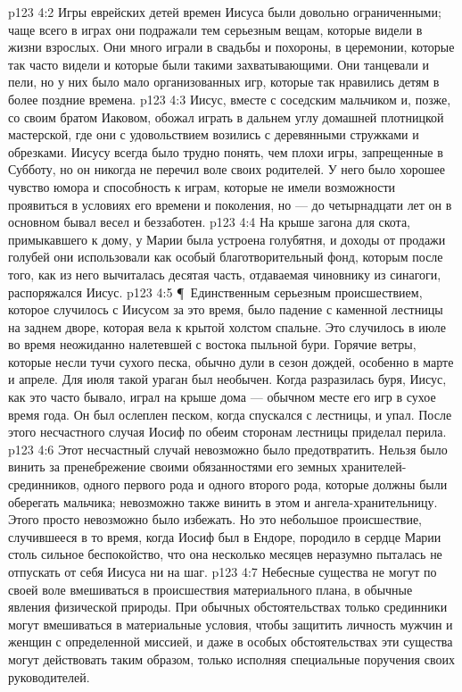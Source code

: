 \vs p123 4:2 Игры еврейских детей времен Иисуса были довольно ограниченными; чаще всего в играх они подражали тем серьезным вещам, которые видели в жизни взрослых. Они много играли в свадьбы и похороны, в церемонии, которые так часто видели и которые были такими захватывающими. Они танцевали и пели, но у них было мало организованных игр, которые так нравились детям в более поздние времена.
\vs p123 4:3 Иисус, вместе с соседским мальчиком и, позже, со своим братом Иаковом, обожал играть в дальнем углу домашней плотницкой мастерской, где они с удовольствием возились с деревянными стружками и обрезками. Иисусу всегда было трудно понять, чем плохи игры, запрещенные в Субботу, но он никогда не перечил воле своих родителей. У него было хорошее чувство юмора и способность к играм, которые не имели возможности проявиться в условиях его времени и поколения, но --- до четырнадцати лет он в основном бывал весел и беззаботен.
\vs p123 4:4 На крыше загона для скота, примыкавшего к дому, у Марии была устроена голубятня, и доходы от продажи голубей они использовали как особый благотворительный фонд, которым после того, как из него вычиталась десятая часть, отдаваемая чиновнику из синагоги, распоряжался Иисус.
\vs p123 4:5 \P\ Единственным серьезным происшествием, которое случилось с Иисусом за это время, было падение с каменной лестницы на заднем дворе, которая вела к крытой холстом спальне. Это случилось в июле во время неожиданно налетевшей с востока пыльной бури. Горячие ветры, которые несли тучи сухого песка, обычно дули в сезон дождей, особенно в марте и апреле. Для июля такой ураган был необычен. Когда разразилась буря, Иисус, как это часто бывало, играл на крыше дома --- обычном месте его игр в сухое время года. Он был ослеплен песком, когда спускался с лестницы, и упал. После этого несчастного случая Иосиф по обеим сторонам лестницы приделал перила.
\vs p123 4:6 Этот несчастный случай невозможно было предотвратить. Нельзя было винить за пренебрежение своими обязанностями его земных хранителей\hyp{}срединников, одного первого рода и одного второго рода, которые должны были оберегать мальчика; невозможно также винить в этом и ангела\hyp{}хранительницу. Этого просто невозможно было избежать. Но это небольшое происшествие, случившееся в то время, когда Иосиф был в Ендоре, породило в сердце Марии столь сильное беспокойство, что она несколько месяцев неразумно пыталась не отпускать от себя Иисуса ни на шаг.
\vs p123 4:7 Небесные существа не могут по своей воле вмешиваться в происшествия материального плана, в обычные явления физической природы. При обычных обстоятельствах только срединники могут вмешиваться в материальные условия, чтобы защитить личность мужчин и женщин с определенной миссией, и даже в особых обстоятельствах эти существа могут действовать таким образом, только исполняя специальные поручения своих руководителей.
